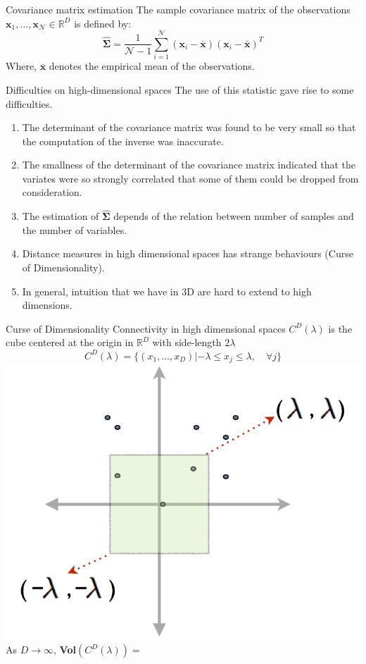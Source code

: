 \documentclass[10pt]{beamer}
\def\x{{\mathbf {x}}}
\def\realset{{\mathbb{R}}}
\def\dimension{D}
\newcommand{\vectorI}{\x}
\newcommand{\SSigma}{\boldsymbol\Sigma}
\begin{document}
\begin{frame}{Covariance matrix estimation}
The sample covariance matrix of the observations $\vectorI_1,\ldots,\vectorI_\mathcal{N} \in \mathbb{R}^\dimension$ is defined by:
\begin{equation}
\hat{\SSigma}=\frac{1}{\mathcal{N} -1}\sum_{i=1}^{\mathcal{N} } (\vectorI_i-\bar{\vectorI})(\vectorI_i-\bar{\vectorI})^T
\end{equation}
Where, $\bar{\vectorI}$ denotes the empirical mean of the observations.
\end{frame}

\begin{frame}{Difficulties on high-dimensional spaces}
The use of this statistic gave rise to some difficulties. 
\begin{enumerate}
\item The determinant of the covariance matrix was found to be very small so that the computation of the inverse was inaccurate.
\item The smallness of the determinant of the covariance
 matrix indicated that the variates were so strongly correlated that some of them could be dropped from consideration.
 \item The estimation of  $\hat{\SSigma}$ depends of the relation between number of samples and the number of variables.
 \item Distance measures in high dimensional spaces has strange behaviours (Curse of Dimensionality).
 \item In general, intuition that we have in 3D are hard to extend to high dimensions.
 \end{enumerate}
 \end{frame}
 
 \begin{frame}{Curse of Dimensionality}
Connectivity in high dimensional spaces
$C^{\dimension}(\lambda)$ is the cube centered at the origin in $\realset^\dimension$ with side-length $2\lambda$
\begin{equation*}
C^{\dimension}(\lambda)=\{(x_1,\ldots,x_\dimension) | -\lambda \leq x_{j} \leq \lambda, \quad \forall j \}
\end{equation*}
\includegraphics[width=.5\textwidth]{BoxLambda}
\alert{As $\dimension \to \infty$}, \textbf{Vol}$(C^{\dimension}(\lambda))=$
\end{frame}
\end{document}
